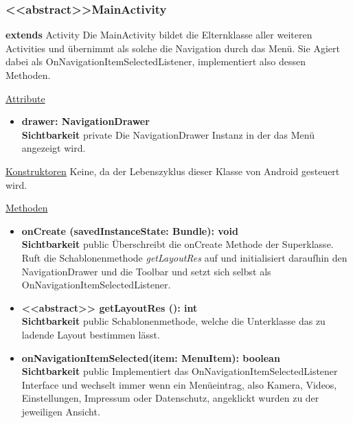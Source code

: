 \subsubsection{<<abstract>>MainActivity} \label{app:klasse:MainActivity}
\textbf{extends} Activity \newline
Die MainActivity bildet die Elternklasse aller weiteren Activities und übernimmt als solche die Navigation durch das Menü. Sie Agiert dabei als OnNavigationItemSelectedListener, implementiert also dessen Methoden.
\newline

\underline{Attribute}
\begin{itemize}
\itemsep0pt
\item \textbf{drawer: NavigationDrawer} \hfill\\ 
\textbf{Sichtbarkeit} private\newline
Die NavigationDrawer Instanz in der das Menü angezeigt wird.

\end{itemize}

\underline{Konstruktoren}\newline
\indent Keine, da der Lebenszyklus dieser Klasse von Android gesteuert wird.\newline

\underline{Methoden}
\begin{itemize}
\itemsep0pt

\item \textbf{onCreate (savedInstanceState: Bundle): void}\hfill\\
\textbf{Sichtbarkeit} public\newline
Überschreibt die onCreate Methode der Superklasse. Ruft die Schablonenmethode \textit{getLayoutRes} auf und initialisiert daraufhin den NavigationDrawer und die Toolbar und setzt sich selbst als OnNavigationItemSelectedListener.

\item \textbf{ <<abstract>> getLayoutRes (): int}\hfill\\
\textbf{Sichtbarkeit} public\newline
Schablonenmethode, welche die Unterklasse das zu ladende Layout bestimmen lässt.

\item \textbf{onNavigationItemSelected(item: MenuItem): boolean}\hfill\\
\textbf{Sichtbarkeit} public\newline
Implementiert das OnNavigationItemSelectedListener Interface und wechselt immer wenn ein Menüeintrag, also Kamera, Videos, Einstellungen, Impressum oder Datenschutz, angeklickt wurden zu der jeweiligen Ansicht.

\end{itemize}